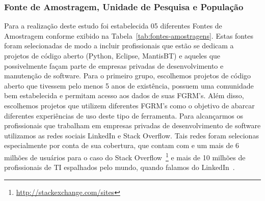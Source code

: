\subsubsection{Fonte de Amostragem, Unidade de Pesquisa e População}

Para a realização deste estudo foi estabelecida 05 diferentes Fontes de
Amostragem conforme exibido na Tabela~\ref{tab:fontes-amostragens}. Estas fontes
foram selecionadas de modo a incluir profissionais que estão se dedicam a
projetos de código aberto (Python, Eclipse, MantisBT) e aqueles que
possivelmente façam parte de empresas privadas de desenvolvimento e manutenção
de software. Para o primeiro grupo, escolhemos projetos de código aberto que
tivessem pelo menos 5 anos de existência, possuem uma comunidade bem
estabelecida e permitam acesso aos dados de suas FGRM's. Além disso, escolhemos
projetos que utilizem diferentes FGRM's como o objetivo de abarcar diferentes
experiências de uso deste tipo de ferramenta. Para alcançarmos os profissionais
que trabalham em empresas privadas de desenvolvimento de software utilizamos  as
redes sociais LinkedIn e Stack Overflow. Tais redes foram selecionas
especialmente por conta de sua cobertura, que contam com e um mais de 6 milhões
de usuários para o caso do Stack
Overflow~\footnote{\url{http://stackexchange.com/sites}} e mais de 10 milhões de
profissionais de TI espalhados pelo mundo, quando falamos do
LinkedIn~\cite{de2014towards}.

\begin{table}[htb]
\centering
{}
\caption{Fontes de Amostragem utilizadas no estudo.}
\label{tb:fonte-de-amostragens}
\end{table}

